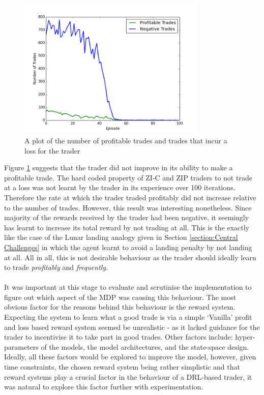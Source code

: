 \documentclass[ %
                    author={Ashwinder Khurana},
                supervisor={Prof Dave Cliff},
                    degree={MEng},
                     title={The Deeply Reinforced Trader},
                  subtitle={},
                      type={enterprise},
                      year={2020} ]{dissertation}
\begin{document}
{\begin{figure}[H] 
	\centering
  	\includegraphics[width=0.8\textwidth]{PG-Vanilla-Good-Vs-Bad-Trades.png}
  	\caption{A plot of the number of profitable trades and trades that incur a loss for the trader }
	\label{fig:PG-Vanilla-Good-Vs-Bad}  
\end{figure}

\noindent
Figure \ref{fig:PG-Vanilla-Good-Vs-Bad} suggests that the trader did not improve in its ability to make a profitable trade. The hard coded property of ZI-C and ZIP traders to not trade at a loss was not learnt by the trader in its experience over 100 iterations. Therefore the rate at which the trader traded profitably did not increase relative to the number of trades. However, this result was interesting nonetheless. Since majority of the rewards received by the trader had been negative, it seemingly has learnt to increase its total reward by not trading at all. This is the exactly like the case of the Lunar landing analogy given in Section \ref{section:Central Challenges} in which the agent learnt to avoid a landing penalty by not landing at all. All in all, this is not desirable behaviour as the trader should ideally learn to trade \textit{profitably} and \textit{frequently}.
\\
\\
\noindent
It was important at this stage to evaluate and scrutinise the implementation to figure out which aspect of the MDP was causing this behaviour. The most obvious factor for the reasons behind this behaviour is the reward system. Expecting the system to learn what a good trade is via a simple \enquote*{Vanilla} profit and loss based reward system seemed be unrealistic - as it lacked guidance for the trader to incentivise it to take part in good trades. Other factors include: hyper-parameters of the models, the model architectures, and the state-space design. Ideally, all these factors would be explored to improve the model, however, given time constraints, the chosen reward system being rather simplistic and that reward systems play a crucial factor in the behaviour of a DRL-based trader, it was natural to explore this factor further with experimentation.

}
\end{document}
